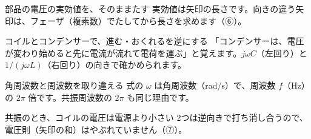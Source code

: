 \begin{tsumazuki}{部品の電圧の実効値を、そのままたす}
実効値は矢印の長さです。向きの違う矢印は、フェーザ（複素数）でたしてから長さを求めます（⑥）。
\end{tsumazuki}

\begin{tsumazuki}{コイルとコンデンサーで、進む・おくれるを逆にする}
「コンデンサーは、電圧が変わり始めると先に電流が流れて電荷を運ぶ」と覚えます。$j\omega C$（左回り）と $1/(j\omega L)$（右回り）の向きで確かめられます。
\end{tsumazuki}

\begin{tsumazuki}{角周波数と周波数を取り違える}
式の $\omega$ は角周波数（rad/s）で、周波数 $f$（Hz）の $2\pi$ 倍です。共振周波数の $2\pi$ も同じ理由です。
\end{tsumazuki}

\begin{tsumazuki}{共振のとき、コイルの電圧は電源より小さい}
2つは逆向きで打ち消し合うので、電圧則（矢印の和）はやぶれていません（⑦）。
\end{tsumazuki}

